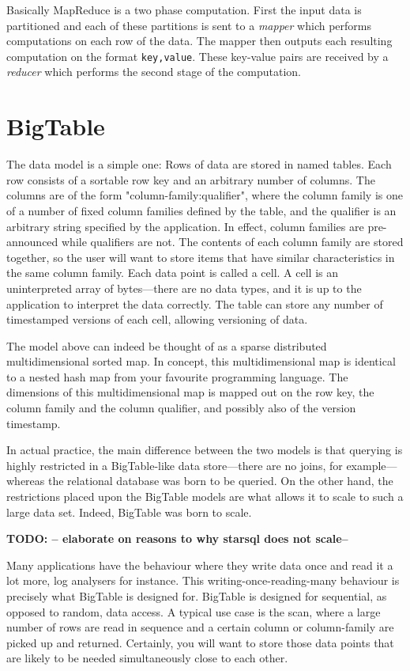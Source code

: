 \documentclass[a4paper,10pt]{book}
\begin{document}
Basically MapReduce is a two phase computation. First the input data is
partitioned and each of these partitions is sent to a \textit{mapper} which
performs computations on each row of the data. The mapper then outputs each
resulting computation on the format \texttt{key,value}. These key-value
pairs are received by a \textit{reducer} which performs the second stage of
the computation.


\section{BigTable}

The data model is a simple one: Rows of data are stored in named tables.
Each row consists of a sortable row key and an arbitrary number of columns.
The columns are of the form "column-family:qualifier", where the column
family is one of a number of fixed column families defined by the table,
and the qualifier is an arbitrary string specified by the application. In
effect, column families are pre-announced while qualifiers are not. The
contents of each column family are stored together, so the user will want
to store items that have similar characteristics in the same column family.
Each data point is called a cell. A cell is an uninterpreted array of
bytes---there are no data types, and it is up to the application to
interpret the data correctly. The table can store any number of timestamped
versions of each cell, allowing versioning of data.

The model above can indeed be thought of as a sparse distributed
multidimensional sorted map. In concept, this multidimensional map is
identical to a nested hash map from your favourite programming language. The
dimensions of this multidimensional map is mapped out on the row key, the
column family and the column qualifier, and possibly also of the version
timestamp.

In actual practice, the main difference between the two models is that
querying is highly restricted in a BigTable-like data store---there are no
joins, for example---whereas the relational database was born to be queried.
On the other hand, the restrictions placed upon the BigTable models are
what allows it to scale to such a large data set. Indeed, BigTable was born
to scale.

\textbf{TODO: -- elaborate on reasons to why starsql does not scale--}

Many applications have the behaviour where they write data once and read it
a lot more, log analysers for instance. This writing-once-reading-many
behaviour is precisely what BigTable is designed for. BigTable is designed
for sequential, as opposed to random, data access. A typical use case is
the scan, where a large number of rows are read in sequence and a certain
column or column-family are picked up and returned. Certainly, you will
want to store those data points that are likely to be needed simultaneously
close to each other. \cite{bigtable}
\end{document}
